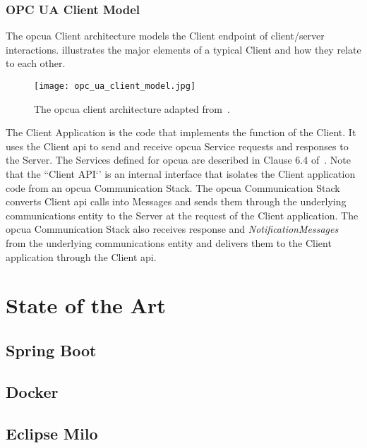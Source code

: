 \documentclass[
a4paper,
twoside,
headsepline,
cleardoublepage=empty,
parskip=half,
draft=false
]{scrbook}
\begin{document}
			\subsection{OPC UA Client Model}\label{subsec:opc_ua_client_model}
		
				The \gls{opcua} Client architecture models the Client endpoint of client/server interactions.  illustrates the major elements of a typical Client and how they relate to each other.
		
				\begin{figure}[htbp]
					\centering
					\texttt{[image: opc\_ua\_client\_model.jpg]}
					\caption{The \gls{opcua} client architecture adapted from~\cite{opcfoundation2017part1}.}
					\label{fig:opc_ua_client_model}
				\end{figure}
			
				The Client Application is the code that implements the function of the Client. 
				It uses the Client \gls{api} to send and receive \gls{opcua} Service requests and responses to the Server. 
				The Services defined for \gls{opcua} are described in Clause 6.4 of~\cite{opcfoundation2017part4}.
				Note that the ``Client API`' is an internal interface that isolates the Client application code from an \gls{opcua} Communication Stack. 
				The \gls{opcua} Communication Stack converts Client \gls{api} calls into Messages and sends them through the underlying communications entity to the Server at the request of the Client application. 
				The \gls{opcua} Communication Stack also receives response and \textit{NotificationMessages} from the underlying communications entity and delivers them to the Client application through the Client \gls{api}.
		
	\chapter{State of the Art}\label{ch:state_of_the_art}
			
		\section{Spring Boot}\label{subsec:spring_boot}
		
		\section{Docker}\label{sec:docker}
		
		\section{Eclipse Milo}\label{sec:eclipse_milo}
		
\end{document}
